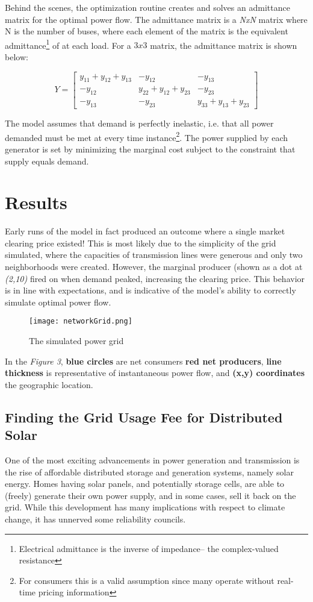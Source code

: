 \documentclass{article}
\begin{document}
Behind the scenes, the optimization routine creates and solves an admittance matrix for the optimal power flow. The admittance matrix is a \emph{NxN} matrix where N is the number of buses, where each element of the matrix is the equivalent admittance\footnote{Electrical admittance is the inverse of impedance-- the complex-valued resistance} of at each load. For a $3x3$ matrix, the admittance matrix is shown below:

\[ Y = 
\begin{bmatrix}
	 y_{11} + y_{12} + y_{13} &  -y_{12} & -y_{13} \\
	 -y_{12} & y_{22} + y_{12} + y_{23} & -y_{23} \\ 
	 -y_{13} & -y_{23} & y_{33} + y_{13} + y_{23}
\end{bmatrix}
\]

The model assumes that demand is perfectly inelastic, i.e. that all power demanded must be met at every time instance\footnote{For consumers this is a valid assumption since many operate without real-time pricing information}. The power supplied by each generator is set by minimizing the marginal cost subject to the constraint that supply equals demand.

\section{Results}
Early runs of the model in fact produced an outcome where a single market clearing price existed! This is most likely due to the simplicity of the grid simulated, where the capacities of transmission lines were generous and only two neighborhoods were created. However, the marginal producer (shown as a dot at \emph{(2,10)} fired on when demand peaked, increasing the clearing price. This behavior is in line with expectations, and is indicative of the model's ability to correctly simulate optimal power flow. 

\begin{figure}[h!]
	\centering
	\texttt{[image: networkGrid.png]}
	\caption{The simulated power grid}
\end{figure}

In the \emph{Figure 3}, \textbf{blue circles} are net consumers \textbf{red net producers}, \textbf{line thickness} is representative of instantaneous power flow, and \textbf{(x,y) coordinates} the geographic location.

\subsection{Finding the Grid Usage Fee for Distributed Solar}
One of the most exciting advancements in power generation and transmission is the rise of affordable distributed storage and generation systems, namely solar energy. Homes having solar panels, and potentially storage cells, are able to (freely) generate their own power supply, and in some cases, sell it back on the grid. While this development has many implications with respect to climate change, it has unnerved some reliability councils. \
\end{document}
